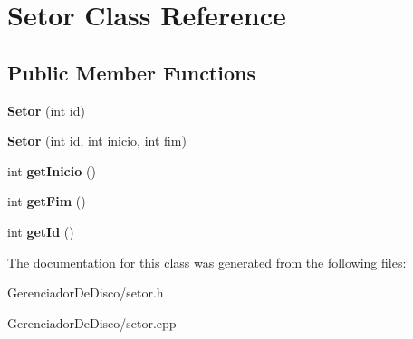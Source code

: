 \hypertarget{classSetor}{}\section{Setor Class Reference}
\label{classSetor}
\subsection*{Public Member Functions}
\begin{DoxyCompactItemize}
\item 
\hypertarget{classSetor_ad547a9f194a2cb2d763371f16c42e99e}{}{\bfseries Setor} (int id)\label{classSetor_ad547a9f194a2cb2d763371f16c42e99e}

\item 
\hypertarget{classSetor_a5ab13049bf55eddc4586212567a936ed}{}{\bfseries Setor} (int id, int inicio, int fim)\label{classSetor_a5ab13049bf55eddc4586212567a936ed}

\item 
\hypertarget{classSetor_ae31a039bd0ac2d1c76802198abf8f076}{}int {\bfseries get\+Inicio} ()\label{classSetor_ae31a039bd0ac2d1c76802198abf8f076}

\item 
\hypertarget{classSetor_a5f46674630604f4ef6215985bbc97a9e}{}int {\bfseries get\+Fim} ()\label{classSetor_a5f46674630604f4ef6215985bbc97a9e}

\item 
\hypertarget{classSetor_a3a86ea9d1832d230fb7abe4fafbe0bf5}{}int {\bfseries get\+Id} ()\label{classSetor_a3a86ea9d1832d230fb7abe4fafbe0bf5}

\end{DoxyCompactItemize}


The documentation for this class was generated from the following files\+:\begin{DoxyCompactItemize}
\item 
Gerenciador\+De\+Disco/setor.\+h\item 
Gerenciador\+De\+Disco/setor.\+cpp\end{DoxyCompactItemize}
